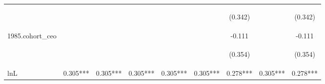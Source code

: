 \begin{center}
\begin{tabular}{lcccccccc}
\vspace{4pt} & \begin{footnotesize}\end{footnotesize} & \begin{footnotesize}\end{footnotesize} & \begin{footnotesize}\end{footnotesize} & \begin{footnotesize}\end{footnotesize} & \begin{footnotesize}\end{footnotesize} & \begin{footnotesize}(0.342)\end{footnotesize} & \begin{footnotesize}\end{footnotesize} & \begin{footnotesize}(0.342)\end{footnotesize} \\
1985.cohort\_ceo &  &  &  &  &  & -0.111 &  & -0.111 \\
\vspace{4pt} & \begin{footnotesize}\end{footnotesize} & \begin{footnotesize}\end{footnotesize} & \begin{footnotesize}\end{footnotesize} & \begin{footnotesize}\end{footnotesize} & \begin{footnotesize}\end{footnotesize} & \begin{footnotesize}(0.354)\end{footnotesize} & \begin{footnotesize}\end{footnotesize} & \begin{footnotesize}(0.354)\end{footnotesize} \\
lnL & 0.305*** & 0.305*** & 0.305*** & 0.305*** & 0.305*** & 0.278*** & 0.305*** & 0.278*** \\

\end{tabular}
\end{center}
